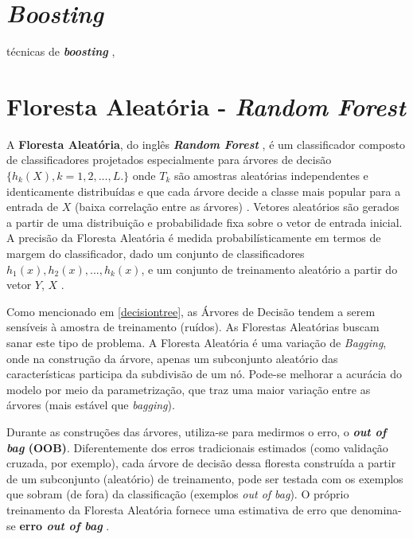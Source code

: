 \documentclass[
]{book}
\begin{document}
\hypertarget{boost}{%
\section{\texorpdfstring{\emph{Boosting}}{Boosting}}\label{boost}}

técnicas de \textbf{\emph{boosting}} \citep{freund1996experiments},

\hypertarget{rf}{%
\section{\texorpdfstring{Floresta Aleatória - \emph{Random Forest}}{Floresta Aleatória - Random Forest}}\label{rf}}

A \textbf{Floresta Aleatória}, do inglês \textbf{\emph{Random Forest}} \citep{breiman2001random, liaw2002classification}, é um classificador composto de classificadores projetados especialmente para árvores de decisão \(\{h_k(X),k=1,2,...,L.\}\) onde \(T_k\) são amostras aleatórias independentes e identicamente distribuídas e que cada árvore decide a classe mais popular para a entrada de \(X\) (baixa correlação entre as árvores) . Vetores aleatórios são gerados a partir de uma distribuição e probabilidade fixa sobre o vetor de entrada inicial. A precisão da Floresta Aleatória é medida probabilísticamente em termos de margem do classificador, dado um conjunto de classificadores \(h_1(x), h_2(x),...,h_k(x)\), e um conjunto de treinamento aleatório a partir do vetor \(Y\), \(X\) \citep{gomez2012random}.

Como mencionado em \ref{decisiontree}, as Árvores de Decisão tendem a serem sensíveis à amostra de treinamento (ruídos). As Florestas Aleatórias buscam sanar este tipo de problema. A Floresta Aleatória é uma variação de \emph{Bagging}, onde na construção da árvore, apenas um subconjunto aleatório das características participa da subdivisão de um nó. Pode-se melhorar a acurácia do modelo por meio da parametrização, que traz uma maior variação entre as árvores (mais estável que \emph{bagging}).

Durante as construções das árvores, utiliza-se para medirmos o erro, o \textbf{\emph{out of bag} (OOB)}. Diferentemente dos erros tradicionais estimados (como validação cruzada, por exemplo), cada árvore de decisão dessa floresta construída a partir de um subconjunto (aleatório) de treinamento, pode ser testada com os exemplos que sobram (de fora) da classificação (exemplos \emph{out of bag}). O próprio treinamento da Floresta Aleatória fornece uma estimativa de erro que denomina-se \textbf{erro \emph{out of bag} }.
\end{document}
